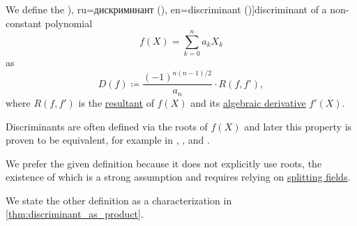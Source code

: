 \begin{definition}\label{def:discriminant}
  We define the \term[bg=дискриминанта (\cite[215]{Обрешков1962ВисшаАлгебра}), ru=дискриминант (\cite[141]{Винберг2014КурсАлгебры}), en=discriminant (\cite[223]{Rotman2015AdvancedModernAlgebraPart1})]{discriminant} of a non-constant polynomial
  \begin{equation*}
    f(X) = \sum_{k=0}^n a_k X_k
  \end{equation*}
  as
  \begin{equation*}
    D(f) \coloneqq \frac {(-1)^{n(n-1)/2}} {a_n} \cdot R(f, f'),
  \end{equation*}
  where \( R(f, f') \) is the \hyperref[def:resultant]{resultant} of \( f(X) \) and its \hyperref[def:algebraic_derivative]{algebraic derivative} \( f'(X) \).
\end{definition}
\begin{comments}
  \item Discriminants are often defined via the roots of \( f(X) \) and later this property is proven to be equivalent, for example in
  \cite[227]{Кострикин2020АлгебраЧасть1},
  \cite[258]{Jacobson1985BasicAlgebraI},
  \cite[192]{Lang2002Algebra} and
  \cite[223]{Rotman2015AdvancedModernAlgebraPart1}.

  We prefer the given definition because it does not explicitly use roots, the existence of which is a strong assumption and requires relying on \hyperref[def:splitting_field]{splitting fields}.

  We state the other definition as a characterization in \cref{thm:discriminant_as_product}.
\end{comments}


